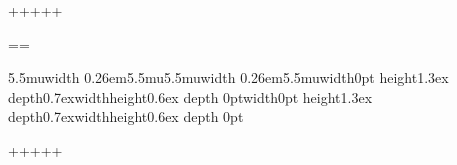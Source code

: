 \rthooka\lthookb\dthooka\uthooka{}\rthooka
\lthookb\dthooka\uthooka

\hho\hho\circ\circ%
\hhO\hhO{\scriptstyle\bigcirc}{\scriptstyle\bigcirc}%

\lhtimes\rhtimes\uhtimes\dhtimes\newarrowtail+++++


\Yright\Yleft\Yup\Ydown

\leftharpoondown\rightharpoondown\upharpoonright
\downharpoonright




\newarrowfiller{=}=={}{}%
\def\vfthree{\mid\!\!\!\mid\!\!\!\mid}%
\equiv\equiv\vfthree\vfthree

\def\vfdashstrut{\vrule width0pt height1.3ex depth0.7ex}%
\def\vfthedash{\vrule width\CD@LF height0.6ex depth 0pt}%
\def\hfthedash{\CD@AJ\vrule\horizhtdp width 0.26em}%
\def\hfdash{\mkern5.5mu\hfthedash\mkern5.5mu}%
\def\vfdash{\vfdashstrut\vfthedash}%
\hfdash\hfdash\vfdash\vfdash


\newarrowmiddle+++++




